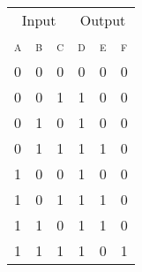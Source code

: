 \documentclass{standalone}
\begin{document}
\begin{tabular}{*{6}{c}}
	\toprule
		\multicolumn{3}{c}{Input} & \multicolumn{3}{c}{Output}\\
		\cmidrule(lr){1-3} \cmidrule(lr){4-6}
		\textsc{a} & \textsc{b} & \textsc{c} & \textsc{d} & \textsc{e} & \textsc{f} \\
	\midrule
		0 & 0 & 0 & 0 & 0 & 0 \\\hline
		0 & 0 & 1 & 1 & 0 & 0 \\\hline
		0 & 1 & 0 & 1 & 0 & 0 \\\hline
		0 & 1 & 1 & 1 & 1 & 0 \\\hline
		1 & 0 & 0 & 1 & 0 & 0 \\\hline
		1 & 0 & 1 & 1 & 1 & 0 \\\hline
		1 & 1 & 0 & 1 & 1 & 0 \\\hline
		1 & 1 & 1 & 1 & 0 & 1 \\
		\bottomrule
\end{tabular}
\end{document}
